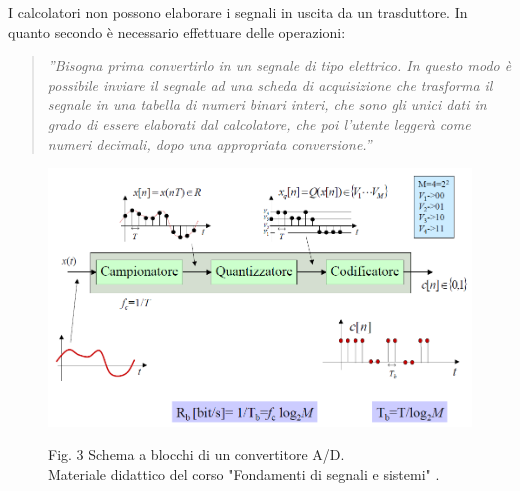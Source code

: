 \documentclass[a4paper]{report} %
\begin{document}
I calcolatori non possono elaborare i segnali in uscita da un trasduttore. In quanto secondo \cite{art:rif.2} è necessario effettuare delle operazioni: 
\begin{quote}
	\textit{''Bisogna prima convertirlo in un segnale di tipo elettrico. In questo modo è possibile inviare il segnale ad una scheda di acquisizione che trasforma il segnale in una tabella di numeri binari interi, che sono gli unici dati in grado di essere elaborati dal calcolatore, che poi l'utente leggerà come numeri decimali, dopo una appropriata conversione.''}
\end{quote}

 
\begin{figure}
	\centering
	\includegraphics[scale=.4]{Immagini/schemaAD.png}
	
	Fig. 3 Schema a blocchi di un convertitore A/D. \\
	Materiale didattico del corso "Fondamenti di segnali e sistemi" \cite{art:rif.7}.
\end{figure}
\end{document}
